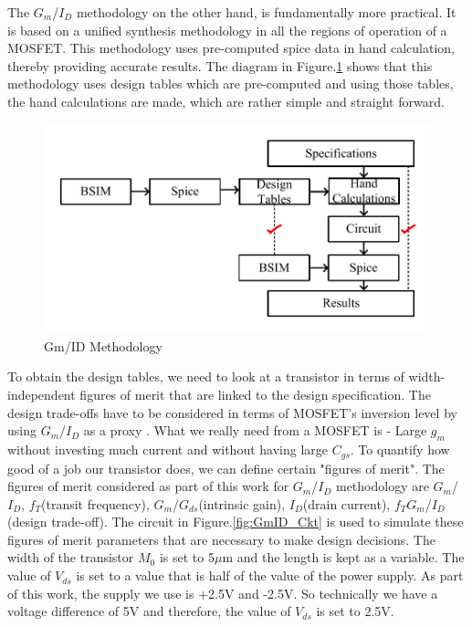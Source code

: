 The $G_m$/$I_D$ methodology on the other hand, is fundamentally more practical. It is based on a unified synthesis methodology in all the regions of operation of a MOSFET. This methodology uses pre-computed spice data in hand calculation, thereby providing accurate results. The diagram in Figure.\ref{fig:GmID} shows that this methodology uses design tables which are pre-computed and using those tables, the hand calculations are made, which are rather simple and straight forward. 

\begin{figure} [H]
\centering
\includegraphics[scale=1]{Figures/Misc/PDFs/GmID.pdf}
\caption{Gm/ID Methodology}
\label{fig:GmID}
\end{figure}
To obtain the design tables, we need to look at a transistor in terms of width-independent figures of merit that are linked to the design specification. The design trade-offs have to be considered in terms of MOSFET's inversion level by using $G_m$/$I_D$ as a proxy \cite{gmid_basic}. What we really need from a MOSFET is - Large $g_m$ without investing much current and without having large $C_{gs}$. To quantify how good of a job our transistor does, we can define certain "figures of merit". The figures of merit considered as part of this work for $G_m$/$I_D$ methodology are $G_m$/$I_D$, $f_T$(transit frequency), $G_m$/$G_{ds}$(intrinsic gain), $I_D$(drain current), $f_TG_m$/$I_D$ (design trade-off). The circuit in Figure.\ref{fig:GmID_Ckt} is used to simulate these figures of merit parameters that are necessary to make design decisions. The width of the transistor $M_0$ is set to 5$\mu$m and the length is kept as a variable. The value of $V_{ds}$ is set to a value that is half of the value of the power supply. As part of this work, the supply we use is +2.5V and -2.5V. So technically we have a voltage difference of 5V and therefore, the value of $V_{ds}$ is set to 2.5V. 
